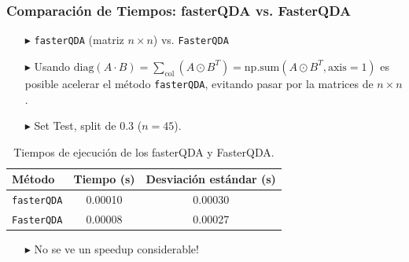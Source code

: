 \begin{frame}
  \frametitle{Comparación de Tiempos: fasterQDA vs. FasterQDA}

    \begin{itemize}
    \item[$\blacktriangleright$] \texttt{fasterQDA} (matriz \(n \times n\)) vs. \texttt{FasterQDA} 
  \end{itemize}
  \vspace{0.4cm}
  \begin{itemize}
    \item[$\blacktriangleright$] Usando \( \text{diag}(A \cdot B) = \sum_{\text{col}}(A \odot B^T) = \text{np.sum}(A \odot B^T, \text{axis}=1) \) es posible acelerar el método \texttt{fasterQDA}, evitando pasar por la matrices de \( n \times n\).
    \item[$\blacktriangleright$] Set Test, split de 0.3 ($n=45$).
  \end{itemize}

  \begin{table}[h!]
      \centering
      \begin{tabular}{@{}lcc@{}}
        \toprule
        \textbf{Método}      & Tiempo (s)           & Desviación estándar (s) \\ 
        \midrule
        \texttt{fasterQDA}   & 0.00010              & 0.00030                 \\ 
        \texttt{FasterQDA}   & 0.00008              & 0.00027                 \\ 
        \bottomrule
      \end{tabular}
      \caption{Tiempos de ejecución de los fasterQDA y FasterQDA.}
  \end{table}

  \begin{itemize}
    \item[$\blacktriangleright$] No se ve un speedup considerable!
  \end{itemize}

\end{frame}


